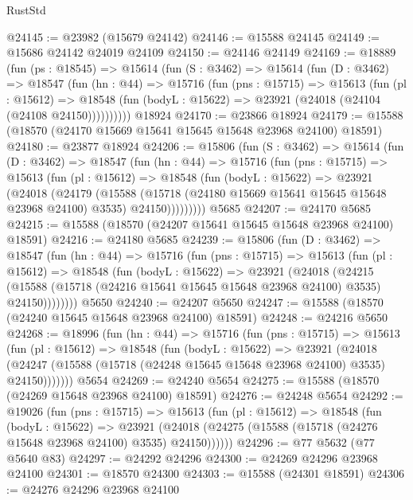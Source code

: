 \begin{lexlean}{RustStd}
\begin{coremodule}
@24145 := @23982 (@15679 @24142)
@24146 := @15588 @24145
@24149 := @15686 @24142 @24019 @24109
@24150 := @24146 @24149
@24169 := @18889
    (fun (ps : @18545) =>
    @15614
      (fun (S : @3462) =>
      @15614
        (fun (D : @3462) =>
        @18547
          (fun (hn : @44) =>
          @15716
            (fun (pns : @15715) =>
            @15613
              (fun (pl : @15612) =>
              @18548 (fun (bodyL : @15622) => @23921 (@24018 (@24104 (@24108 @24150))))))))))
    @18924
@24170 := @23866 @18924
@24179 := @15588 (@18570 (@24170 @15669 @15641 @15645 @15648 @23968 @24100) @18591)
@24180 := @23877 @18924
@24206 := @15806
    (fun (S : @3462) =>
    @15614
      (fun (D : @3462) =>
      @18547
        (fun (hn : @44) =>
        @15716
          (fun (pns : @15715) =>
          @15613
            (fun (pl : @15612) =>
            @18548
              (fun (bodyL : @15622) =>
              @23921
                (@24018
                  (@24179
                    (@15588
                      (@15718 (@24180 @15669 @15641 @15645 @15648 @23968 @24100) @3535)
                      @24150)))))))))
    @5685
@24207 := @24170 @5685
@24215 := @15588 (@18570 (@24207 @15641 @15645 @15648 @23968 @24100) @18591)
@24216 := @24180 @5685
@24239 := @15806
    (fun (D : @3462) =>
    @18547
      (fun (hn : @44) =>
      @15716
        (fun (pns : @15715) =>
        @15613
          (fun (pl : @15612) =>
          @18548
            (fun (bodyL : @15622) =>
            @23921
              (@24018
                (@24215
                  (@15588 (@15718 (@24216 @15641 @15645 @15648 @23968 @24100) @3535) @24150))))))))
    @5650
@24240 := @24207 @5650
@24247 := @15588 (@18570 (@24240 @15645 @15648 @23968 @24100) @18591)
@24248 := @24216 @5650
@24268 := @18996
    (fun (hn : @44) =>
    @15716
      (fun (pns : @15715) =>
      @15613
        (fun (pl : @15612) =>
        @18548
          (fun (bodyL : @15622) =>
          @23921
            (@24018
              (@24247 (@15588 (@15718 (@24248 @15645 @15648 @23968 @24100) @3535) @24150)))))))
    @5654
@24269 := @24240 @5654
@24275 := @15588 (@18570 (@24269 @15648 @23968 @24100) @18591)
@24276 := @24248 @5654
@24292 := @19026
    (fun (pns : @15715) =>
    @15613
      (fun (pl : @15612) =>
      @18548
        (fun (bodyL : @15622) =>
        @23921 (@24018 (@24275 (@15588 (@15718 (@24276 @15648 @23968 @24100) @3535) @24150))))))
@24296 := @77 @5632 (@77 @5640 @83)
@24297 := @24292 @24296
@24300 := @24269 @24296 @23968 @24100
@24301 := @18570 @24300
@24303 := @15588 (@24301 @18591)
@24306 := @24276 @24296 @23968 @24100

\end{coremodule}
\end{lexlean}
